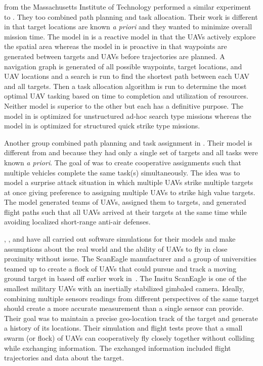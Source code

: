 \textcite{bellingham} from the Massachusetts Institute of Technology performed a similar experiment to \textcite{jin}.   They too combined path planning and task allocation.  Their work is different in that target locations are known \textit{a priori} and they wanted to minimize overall mission time.  The model in \textcite{jin} is a reactive model in that the UAVs actively explore the spatial area whereas the model in \textcite{bellingham} is proactive in that waypoints are generated between targets and UAVs before trajectories are planned.  A navigation graph is generated of all possible waypoints, target locations, and UAV locations and a search is run to find the shortest path between each UAV and all targets.  Then a task allocation algorithm is run to determine the most optimal UAV tasking based on time to completion and utilization of resources.  Neither model is superior to the other but each has a definitive purpose.  The model in \textcite{jin} is optimized for unstructured ad-hoc search type missions whereas the model in \textcite{bellingham} is optimized for structured quick strike type missions.

Another group combined path planning and task assignment in \textcite{beard}.  Their model is different from \textcite{jin} and \textcite{bellingham} because they had only a single set of targets and all tasks were known \textit{a priori}.  The goal of \textcite{beard} was to create cooperative assignments such that multiple vehicles complete the same task(s) simultaneously.  The idea was to model a surprise attack situation in which multiple UAVs strike multiple targets at once giving preference to assigning multiple UAVs to strike high value targets.  The model generated teams of UAVs, assigned them to targets, and generated flight paths such that all UAVs arrived at their targets at the same time while avoiding localized short-range anti-air defenses.



\textcite{jin}, \textcite{bellingham}, and \textcite{beard} have all carried out software simulations for their models and make assumptions about the real world and the ability of UAVs to fly in close proximity without issue.  The ScanEagle manufacturer \textcite{insitu_brochure} and a group of universities teamed up to create a flock of UAVs that could pursue and track a moving ground target in \textcite{wheeler} based off earlier work in~\textcite{wise_rolf}.  The Insitu ScanEagle is one of the smallest military UAVs with an inertially stabilized gimbaled camera.  Ideally, combining multiple sensors readings from different perspectives of the same target should create a more accurate measurement than a single sensor can provide.  Their goal was to maintain a precise geo-location track of the target and generate a history of its locations.  Their simulation and flight tests prove that a small swarm (or flock) of UAVs can cooperatively fly closely together without colliding while exchanging information.  The exchanged information included flight trajectories and data about the target. 

